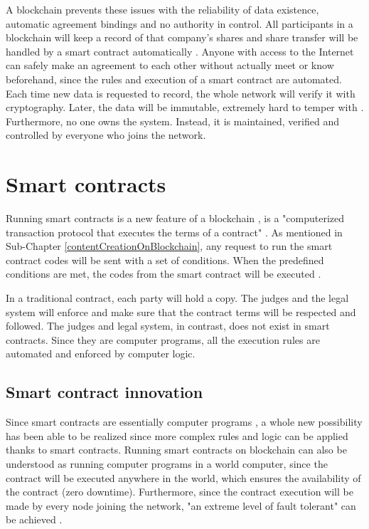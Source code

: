 A blockchain prevents these issues with the reliability of data existence, automatic agreement bindings and no authority in control. All participants in a blockchain will keep a record of that company's shares and share transfer will be handled by a smart contract automatically \citep{RefWorks:doc:BlockchainProtocolInClinicalTrials}. Anyone with access to the Internet can safely make an agreement to each other without actually meet or know beforehand, since the rules and execution of a smart contract are automated.  Each time new data is requested to record, the whole network will verify it with cryptography. Later, the data will be immutable, extremely hard to temper with \citep{RefWorks:doc:BitcoinWhitepaper}\citep{RefWorks:doc:EthereumWhitepaper}. Furthermore, no one owns the system. Instead, it is maintained, verified and controlled by everyone who joins the network.

\section{Smart contracts}

Running smart contracts is a new feature of a blockchain \citep{RefWorks:doc:BlockchainInSustainableEnergySystem}, is a "computerized transaction protocol that executes the terms of a
contract" \citep{SmartContracts}. As mentioned in Sub-Chapter \ref{contentCreationOnBlockchain}, any request to run the smart contract codes will be sent with a set of conditions. When the predefined conditions are met, the codes from the smart contract will be executed \citep{RefWorks:doc:MasteringBlockchain}.

In a traditional contract, each party will hold a copy. The judges and the legal system will enforce and make sure that the contract terms will be respected and followed. The judges and legal system, in contrast, does not exist in smart contracts. Since they are computer programs, all the execution rules are automated and enforced by computer logic.

\subsection{Smart contract innovation}

Since smart contracts are essentially computer programs \citep{Ethdocorg:EVM}, a whole new possibility has been able to be realized since more complex rules and logic can be applied thanks to smart contracts. Running smart contracts on blockchain can also be understood as running computer programs in a world computer, since the contract will be executed anywhere in the world, which ensures the availability of the contract (zero downtime). Furthermore, since the contract execution will be made by every node joining the network, "an extreme level of fault tolerant" can be achieved \citep{Ethdocorg:EVM}.


